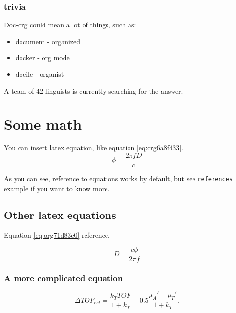 \subsubsection{trivia}
\label{sec:org9f9fa8b}
Doc-org could mean a lot of things, such as:
\begin{itemize}
\item document - organized
\item docker - org mode
\item docile - organist
\end{itemize}
A team of 42 linguists is currently searching for the answer.

\section{Some math}
\label{sec:orgf9fd7df}
You can insert latex equation, like equation \ref{eq:org6a8f433}.
\begin{equation}
\label{eq:org6a8f433}
\phi = \frac{2\pi fD}{c}
\end{equation}

As you can see, reference to equations works by default, but see \texttt{references}
example if you want to know more.

\subsection{Other latex equations}
\label{sec:org39bc917}
Equation \ref{eq:org71d83c0} reference.

\begin{equation}
\label{eq:org71d83c0}
D = \frac{c\phi}{2\pi f}
\end{equation}

\subsubsection{A more complicated equation}
\label{sec:orgcde0ad4}

\begin{equation}
\Delta TOF_{est} = \frac{k_T TOF}{1+k_T } - 0.5 \frac{\mu_A' - \mu_T'}{1+k_T}.
\end{equation}


